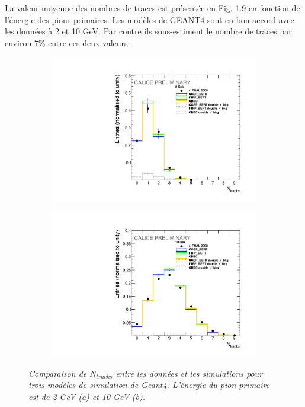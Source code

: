 La valeur moyenne des nombres de traces est présentée en Fig. 1.9 en fonction de l'énergie des pions primaires. Les modèles de GEANT4 sont en bon accord avec les données à 2 et 10 GeV. Par contre ils sous-estiment le nombre de traces par environ 7\% entre ces deux valeurs.   

\begin{figure}
	\centering
	\begin{subfigure}{0.5\textwidth}
		\centering
		\includegraphics[width=.90\linewidth]{ECAL/plots/ntracks-2.pdf}
		\caption{\label{fig:tr2F} }
	\end{subfigure}%
	\begin{subfigure}{0.5\textwidth}
		\centering
		\includegraphics[width=.90\linewidth]{ECAL/plots/ntracks-10.pdf}
		\caption{\label{fig:tr10F} }
	\end{subfigure}
	\caption{\label{fig:NtrackF} \sl Comparaison de $N_{tracks}$ entre les données et les simulations pour trois modèles de simulation de  {\sc Geant}4. L'énergie du pion primaire est de 2 GeV (a) et 10 GeV (b).}
\end{figure}


